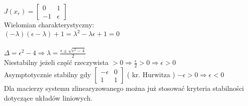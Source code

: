 \documentclass[a4paper,11pt]{article}
\begin{document}
$J(x_r)= \left[ \begin{array}{cc}    0&1 \\-1 & \epsilon    \end{array}\right]$\\
Wielomian charakterystyczny:\\
$(- \lambda)(\epsilon - \lambda)+1 = \lambda^2 - \lambda \epsilon +1 = 0$\\ \\ 
$\Delta = \epsilon^2-4 \Rightarrow \lambda =\frac{\epsilon \pm \sqrt{\epsilon^2-4}}{2}$\\
Niestabilny jeżeli część rzeczywista $>0 \Rightarrow \frac{\epsilon}{2}>0 \Rightarrow \boxed{\epsilon >0}$\\
Asymptotycznie stabilny gdy $\left[ \begin{array}{cc}    -\epsilon & 0 \\ 1 & 1   \end{array}\right]$ ( kr. Hurwitza ) $-\epsilon>0 \Rightarrow \boxed{\epsilon<0}$\\
Dla macierzy systemu zlinearyzowanego można już stosować kryteria stabilności dotyczące układów liniowych.
\end{document}
